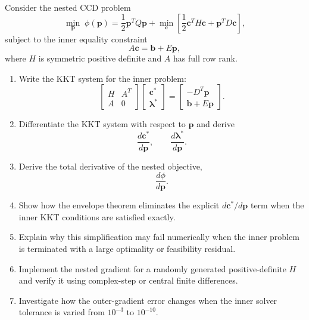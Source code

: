 Consider the nested CCD problem
\begin{equation}
\min_{\mathbf{p}}\;
\phi(\mathbf{p})
=
\frac{1}{2}\mathbf{p}^TQ\mathbf{p}
+
\min_{\mathbf{c}}
\left[
\frac{1}{2}\mathbf{c}^TH\mathbf{c}
+
\mathbf{p}^TD\mathbf{c}
\right],
\end{equation}
subject to the inner equality constraint
\begin{equation}
A\mathbf{c}
=
\mathbf{b}+E\mathbf{p},
\end{equation}
where $H$ is symmetric positive definite and $A$ has full row rank.

\begin{enumerate}
    \item Write the KKT system for the inner problem:
    \begin{equation}
    \begin{bmatrix}
    H&A^T\\
    A&0
    \end{bmatrix}
    \begin{bmatrix}
    \mathbf{c}^*\\
    \boldsymbol{\lambda}^*
    \end{bmatrix}
    =
    \begin{bmatrix}
    -D^T\mathbf{p}\\
    \mathbf{b}+E\mathbf{p}
    \end{bmatrix}.
    \end{equation}

    \item Differentiate the KKT system with respect to $\mathbf{p}$ and
    derive
    \begin{equation}
    \frac{d\mathbf{c}^*}{d\mathbf{p}},
    \qquad
    \frac{d\boldsymbol{\lambda}^*}{d\mathbf{p}}.
    \end{equation}

    \item Derive the total derivative of the nested objective,
    \begin{equation}
    \frac{d\phi}{d\mathbf{p}}.
    \end{equation}

    \item Show how the envelope theorem eliminates the explicit
    $d\mathbf{c}^*/d\mathbf{p}$ term when the inner KKT conditions are
    satisfied exactly.

    \item Explain why this simplification may fail numerically when the inner
    problem is terminated with a large optimality or feasibility residual.

    \item Implement the nested gradient for a randomly generated
    positive-definite $H$ and verify it using complex-step or central finite
    differences.

    \item Investigate how the outer-gradient error changes when the inner
    solver tolerance is varied from $10^{-3}$ to $10^{-10}$.
\end{enumerate}


